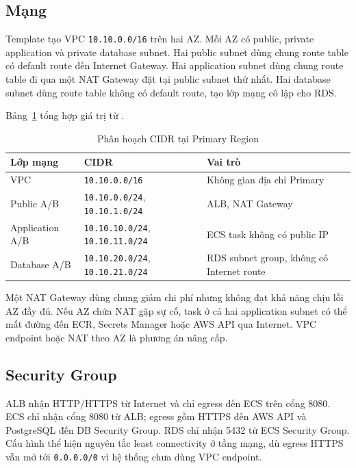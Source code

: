 \subsection{Mạng}

Template  tạo VPC \texttt{10.10.0.0/16} trên hai AZ. Mỗi AZ có public, private application và private database subnet. Hai public subnet dùng chung route table có default route đến Internet Gateway. Hai application subnet dùng chung route table đi qua một NAT Gateway đặt tại public subnet thứ nhất. Hai database subnet dùng route table không có default route, tạo lớp mạng cô lập cho RDS.

Bảng~\ref{tab:primary-cidrs} tổng hợp giá trị từ .

\begin{table}[H]
\centering
\caption{Phân hoạch CIDR tại Primary Region}
\label{tab:primary-cidrs}
\begin{tabularx}{\textwidth}{@{}l l X@{}}
\toprule
\textbf{Lớp mạng} & \textbf{CIDR} & \textbf{Vai trò} \\
\midrule
VPC & \texttt{10.10.0.0/16} & Không gian địa chỉ Primary \\
Public A/B & \texttt{10.10.0.0/24}, \texttt{10.10.1.0/24} & ALB, NAT Gateway \\
Application A/B & \texttt{10.10.10.0/24}, \texttt{10.10.11.0/24} & ECS task không có public IP \\
Database A/B & \texttt{10.10.20.0/24}, \texttt{10.10.21.0/24} & RDS subnet group, không có Internet route \\
\bottomrule
\end{tabularx}
\end{table}

Một NAT Gateway dùng chung giảm chi phí nhưng không đạt khả năng chịu lỗi AZ đầy đủ. Nếu AZ chứa NAT gặp sự cố, task ở cả hai application subnet có thể mất đường đến ECR, Secrets Manager hoặc AWS API qua Internet. VPC endpoint hoặc NAT theo AZ là phương án nâng cấp.

\subsection{Security Group}

ALB nhận HTTP/HTTPS từ Internet và chỉ egress đến ECS trên cổng 8080. ECS chỉ nhận cổng 8080 từ ALB; egress gồm HTTPS đến AWS API và PostgreSQL đến DB Security Group. RDS chỉ nhận 5432 từ ECS Security Group. Cấu hình thể hiện nguyên tắc least connectivity ở tầng mạng, dù egress HTTPS vẫn mở tới \texttt{0.0.0.0/0} vì hệ thống chưa dùng VPC endpoint.

